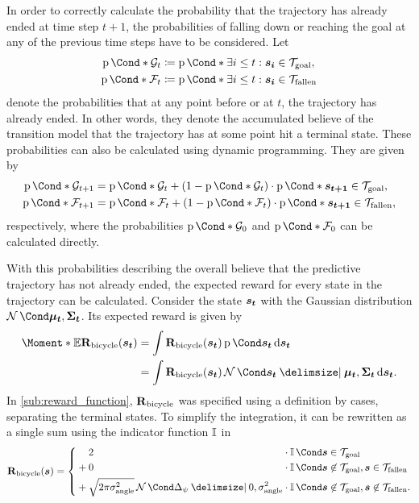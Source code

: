 In order to correctly calculate the probability that the trajectory has already ended at time step $t+1$, the probabilities of falling down or reaching the goal at any of the previous time steps have to be considered.
Let
\begin{align}
    \Prob*{\PGoal_t} &\coloneqq \Prob*{\exists i \leq t : \mat{s_i} \in \Goal}, \\
    \Prob*{\PFallen_t} &\coloneqq \Prob*{\exists i \leq t : \mat{s_i} \in \Fallen}
\end{align}
denote the probabilities that at any point before or at $t$, the trajectory has already ended.
In other words, they denote the accumulated believe of the transition model that the trajectory has at some point hit a terminal state.
These probabilities can also be calculated using dynamic programming.
They are given by
\begin{align}
    \Prob*{\PGoal_{t+1}} &= \Prob*{\PGoal_{t}} + \left( 1 - \Prob*{\PGoal_{t}}  \right) \cdot \Prob*{\mat{s_{t+1}} \in \Goal}, \\
    \Prob*{\PFallen_{t+1}} &= \Prob*{\PFallen_{t}} + \left( 1 - \Prob*{\PFallen_{t}}  \right) \cdot \Prob*{\mat{s_{t+1}} \in \Fallen},
\end{align}
respectively, where the probabilities $\Prob*{\PGoal_{0}}$ and $\Prob*{\PFallen_{0}}$ can be calculated directly.

With this probabilities describing the overall believe that the predictive trajectory has not already ended, the expected reward for every state in the trajectory can be calculated.
Consider the state $\bm{s_t}$ with the Gaussian distribution $\Gaussian{\mat{\mu_t}, \mat{\Sigma_t}}$.
Its expected reward is given by
\begin{align}
    \Moment*{\E}{\RwdBicycle(\rv{s_t})} &= \int \RwdBicycle(\rv{s_t}) \Prob{\rv{s_t}} \diff \rv{s_t} \\
    &= \int \RwdBicycle(\rv{s_t}) \Gaussian{\rv{s_t} \given \mat{\mu_t}, \mat{\Sigma_t}} \diff \rv{s_t}.
\end{align}
In \cref{sub:reward_function}, $\operatorname{\operatorname{\mathbf{R}}_{\text{bicycle}}}$ was specified using a definition by cases, separating the terminal states.
To simplify the integration, it can be rewritten as a single sum using the indicator function $\operatorname{\mathbb{I}}$ in
\begin{align}
    \RwdBicycle(\mat{s}) = \left\{ \begin{alignedat}{3}
            &&& 2 &&\cdot \Indicator{\rv{s} \in \Goal} \\
            &&{}+{}& 0 &&\cdot \Indicator{\rv{s} \not\in\Goal, \rv{s} \in \Fallen} \\
            &&{}+{}& \sqrt{2\pi\sigma_{\text{angle}}^2}\Gaussian{\Delta_\psi \given 0, \sigma_{\text{angle}}^2} &&\cdot \Indicator{\rv{s} \not\in\Goal, \rv{s} \not\in\Fallen}.
        \end{alignedat}\right.
\end{align}


